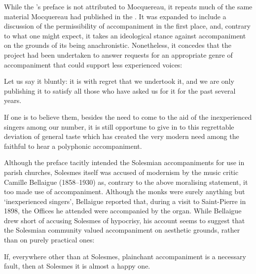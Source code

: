 While the \ldo{}'s preface is not attributed to Mocquereau, it repeats much of the same material Mocquereau had published in the \tsg{}.
It was expanded to include a discussion of the permissibility of accompaniment in the first place, and, contrary to what one might expect, it takes an ideological stance against accompaniment on the grounds of its being anachronistic.
Nonetheless, it concedes that the \ldo{} project had been undertaken to answer requests for an appropriate genre of accompaniment that could support less experienced voices:
\noclub[2]

  {\cite[p.~v]{LivreOrgueChants1898}}
{Let us say it bluntly: it is with regret that we undertook it, and we are only publishing it to satisfy all those who have asked us for it for the past several years.

\parindent=10pt
If one is to believe them, besides the need to come to the aid of the inexperienced singers among our number, it is still opportune to give in to this regrettable deviation of general taste which has created the very modern need among the faithful to hear a polyphonic accompaniment.}
\noindent
Although the preface tacitly intended the Solesmian accompaniments for use in parish churches, Solesmes itself was accused of modernism by the music critic Camille Bellaigue (1858--1930) as, contrary to the above moralising statement, it too made use of accompaniment.
Although the monks were surely anything but `inexperienced singers', Bellaigue reported that, during a visit to Saint-Pierre in 1898, the Offices he attended were accompanied by the organ.
While Bellaigue drew short of accusing Solesmes of hypocrisy, his account seems to suggest that the Solesmian community valued accompaniment on aesthetic grounds, rather than on purely practical ones:

  {\cite[353--5]{BellaigueabbayeSolesmes1898}}
{If, everywhere other than at Solesmes, plainchant accompaniment is a necessary fault, then at Solesmes it is almost a happy one.}

